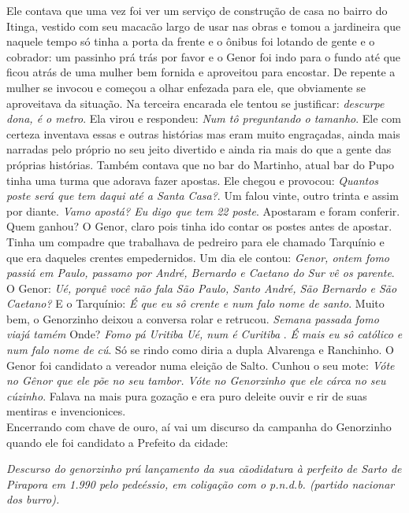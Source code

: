 \documentclass[12pt,brazil,]{book}
\begin{document}
Ele contava que uma vez foi ver um serviço de construção de casa no
bairro do Itinga, vestido com seu macacão largo de usar nas obras e
tomou a jardineira que naquele tempo só tinha a porta da frente e o
ônibus foi lotando de gente e o cobrador: um passinho prá trás por favor
e o Genor foi indo para o fundo até que ficou atrás de uma mulher bem
fornida e aproveitou para encostar. De repente a mulher se invocou e
começou a olhar enfezada para ele, que obviamente se aproveitava da
situação. Na terceira encarada ele tentou se justificar: \emph{descurpe
dona, é o metro}. Ela virou e respondeu: \emph{Num tô preguntando o
tamanho}. Ele com certeza inventava essas e outras histórias mas eram
muito engraçadas, ainda mais narradas pelo próprio no seu jeito
divertido e ainda ria mais do que a gente das próprias histórias. Também
contava que no bar do Martinho, atual bar do Pupo tinha uma turma que
adorava fazer apostas. Ele chegou e provocou: \emph{Quantos poste será
que tem daqui até a Santa Casa?}. Um falou vinte, outro trinta e assim
por diante. \emph{Vamo apostá? Eu digo que tem 22 poste}. Apostaram e
foram conferir. Quem ganhou? O Genor, claro pois tinha ido contar os
postes antes de apostar. Tinha um compadre que trabalhava de pedreiro
para ele chamado Tarquínio e que era daqueles crentes empedernidos. Um
dia ele contou: \emph{Genor, ontem fomo passiá em Paulo, passamo por
André, Bernardo e Caetano do Sur vê os parente}. O Genor: \emph{Ué,
porquê você não fala São Paulo, Santo André, São Bernardo e São
Caetano?} E o Tarquínio: \emph{É que eu sô crente e num falo nome de
santo}. Muito bem, o Genorzinho deixou a conversa rolar e retrucou.
\emph{Semana passada fomo viajá tamém} Onde? \emph{Fomo pá Uritiba}
\emph{Ué, num é Curitiba} . \emph{É mais eu sô católico e num falo nome
de cú}. Só se rindo como diria a dupla Alvarenga e Ranchinho. O Genor
foi candidato a vereador numa eleição de Salto. Cunhou o seu mote:
\emph{Vóte no Gênor que ele põe no seu tambor. Vóte no Genorzinho que
ele cárca no seu cúzinho}. Falava na mais pura gozação e era puro
deleite ouvir e rir de suas mentiras e invencionices.\\
Encerrando com chave de ouro, aí vai um discurso da campanha do
Genorzinho quando ele foi candidato a Prefeito da cidade:

\emph{Descurso do genorzinho prá lançamento da sua cãodidatura à
perfeito de Sarto de Pirapora em 1.990 pelo pedeéssio, em coligação com
o p.n.d.b. (partido nacionar dos burro).}
\end{document}
